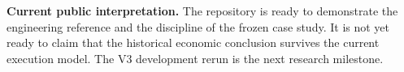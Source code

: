 \begin{statusbox}
\textbf{Current public interpretation.} The repository is ready to demonstrate
the engineering reference and the discipline of the frozen case study. It is
not yet ready to claim that the historical economic conclusion survives the
current execution model. The V3 development rerun is the next research
milestone.
\end{statusbox}
